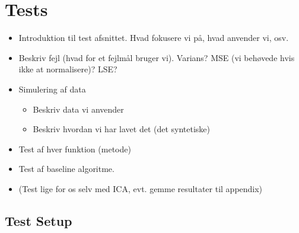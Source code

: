 \section{Tests}
    \begin{itemize}
        \item Introduktion til test afsnittet. Hvad fokusere vi på, hvad anvender vi, osv.
        \item Beskriv fejl (hvad for et fejlmål bruger vi). Varians? MSE (vi behøvede hvis ikke at normalisere)? LSE?
        \item Simulering af data
        \begin{itemize}
            \item Beskriv data vi anvender
            \item Beskriv hvordan vi har lavet det (det syntetiske)
        \end{itemize}
        \item Test af hver funktion (metode)
        \item Test af baseline algoritme.
        \item (Test lige for os selv med ICA, evt. gemme resultater til appendix)
    \end{itemize}
    
\subsection{Test Setup}

